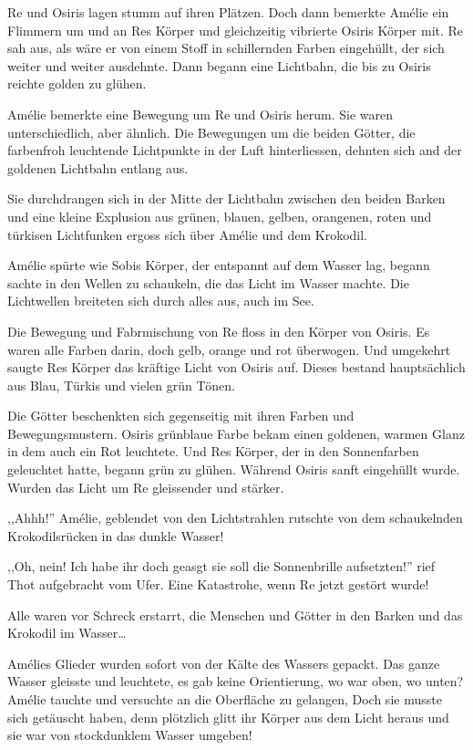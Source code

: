 Re und Osiris lagen stumm auf ihren Plätzen. Doch dann bemerkte Amélie ein Flimmern um und an Res Körper und gleichzeitig vibrierte Osiris Körper mit. Re sah aus, als wäre er von einem Stoff in schillernden Farben eingehüllt, der sich weiter und weiter ausdehnte. Dann begann eine Lichtbahn, die bis zu Osiris reichte golden zu glühen.

Amélie bemerkte eine Bewegung um Re und Osiris herum. Sie waren unterschiedlich, aber ähnlich. Die Bewegungen um die beiden Götter, die farbenfroh leuchtende Lichtpunkte in der Luft hinterliessen, dehnten sich and der goldenen Lichtbahn entlang aus. 

Sie durchdrangen sich in der Mitte der Lichtbahn zwischen den beiden Barken und eine kleine Explusion aus grünen, blauen, gelben, orangenen, roten und türkisen Lichtfunken ergoss sich über Amélie und dem Krokodil.

Amélie spürte wie Sobis Körper, der entspannt auf dem Wasser lag, begann sachte in den Wellen zu schaukeln, die das Licht im Wasser machte. Die Lichtwellen breiteten sich durch alles aus, auch im See.

Die Bewegung und Fabrmischung von Re floss in den Körper von Osiris. Es waren alle Farben darin, doch gelb, orange und rot überwogen. Und umgekehrt saugte Res Körper das kräftige Licht von Osiris auf. Dieses bestand hauptsächlich aus Blau, Türkis und vielen grün Tönen. 

Die Götter beschenkten sich gegenseitig mit ihren Farben und Bewegungsmustern. Osiris grünblaue Farbe bekam einen goldenen, warmen Glanz in dem auch ein Rot leuchtete. Und Res Körper, der in den Sonnenfarben geleuchtet hatte, begann grün zu glühen. Während Osiris sanft eingehüllt wurde. Wurden das Licht um Re gleissender und stärker.

,,Ahhh!'' Amélie, geblendet von den Lichtstrahlen rutschte von dem schaukelnden Krokodilsrücken in das dunkle Wasser!

,,Oh, nein! Ich habe ihr doch geasgt sie soll die Sonnenbrille aufsetzten!'' rief Thot aufgebracht vom Ufer. Eine Katastrohe, wenn Re jetzt gestört wurde!

Alle waren vor Schreck erstarrt, die Menschen und Götter in den Barken und das Krokodil im Wasser\dots

Amélies Glieder wurden sofort von der Kälte des Wassers gepackt. Das ganze Wasser gleisste und leuchtete, es gab keine Orientierung, wo war oben, wo unten? Amélie tauchte und versuchte an die Oberfläche zu gelangen, Doch sie musste sich getäuscht haben, denn plötzlich glitt ihr Körper aus dem Licht heraus und sie war von stockdunklem Wasser umgeben!

